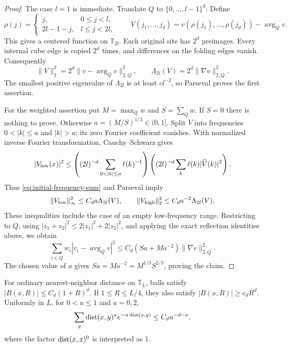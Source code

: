 \begin{proof}
The case $l=1$ is immediate. Translate $Q$ to
$\{0,\ldots,l-1\}^d$. Define
\[
 \rho(j)=
 \begin{cases}j,&0\le j<l,\\2l-1-j,&l\le j<2l,\end{cases}
 \qquad
 V(j_1,\ldots,j_d)=v(\rho(j_1),\ldots,\rho(j_d))
                         -\operatorname{avg}_Qv.
\]
This gives a centered function on $\mathbb T_{2l}$. Each original site
has $2^d$ preimages. Every internal cube edge is copied $2^d$ times,
and differences on the folding edges vanish. Consequently
\[
 \|V\|_2^2=2^d\|v-\operatorname{avg}_Qv\|_{2,Q}^2,
 \qquad \Lambda_{2l}(V)=2^d\|\nabla v\|_{2,Q}^2.
\]
The smallest positive eigenvalue of $\Lambda_{2l}$ is at least
$c l^{-2}$, so Parseval proves the first assertion.

For the weighted assertion put $M=\max_Q w$ and $S=\sum_Qw$.
If $S=0$ there is nothing to prove. Otherwise
$a=(M/S)^{1/3}\in(0,1]$. Split $V$ into frequencies $0<|k|\le a$
and $|k|>a$; its zero Fourier coefficient vanishes. With normalized
inverse Fourier transformation, Cauchy--Schwarz gives
\[
 |V_{\rm low}(x)|^2
 \le\left((2l)^{-d}\sum_{0<|k|\le a}\ell(k)^{-1}\right)
       \left((2l)^{-d}\sum_k\ell(k)|\widehat V(k)|^2\right).
\]
Thus \eqref{eq:initial-frequency-sum} and Parseval imply
\[
 \|V_{\rm low}\|_\infty^2\le C_d a\Lambda_{2l}(V),
 \qquad
 \|V_{\rm high}\|_2^2\le C_d a^{-2}\Lambda_{2l}(V).
\]
These inequalities include the case of an empty low-frequency range.
Restricting to $Q$, using $|z_1+z_2|^2\le2|z_1|^2+2|z_2|^2$,
and applying the exact reflection identities above, we obtain
\[
 \sum_{i\in Q}w_i|v_i-\operatorname{avg}_Qv|^2
 \le C_d(Sa+Ma^{-2})\|\nabla v\|_{2,Q}^2.
\]
The chosen value of $a$ gives
$Sa=Ma^{-2}=M^{1/3}S^{2/3}$, proving the claim.
\end{proof}

\begin{lemma}
\label{lem:lattice-counting}
For ordinary nearest-neighbor distance on $\mathbb T_L$, balls satisfy
$|B(x,R)|\le C_d(1+R)^d$. If $1\le R\le L/4$, they also satisfy
$|B(x,R)|\ge c_dR^d$. Uniformly in $L$, for $0<u\le1$ and $a=0,2$,
\begin{equation}\label{eq:lattice-exponential-moments}
 \sum_y\operatorname{dist}(x,y)^a e^{-u\operatorname{dist}(x,y)}\le C_d u^{-d-a},
\end{equation}
where the factor $\operatorname{dist}(x,x)^0$ is interpreted as $1$.
\end{lemma}

